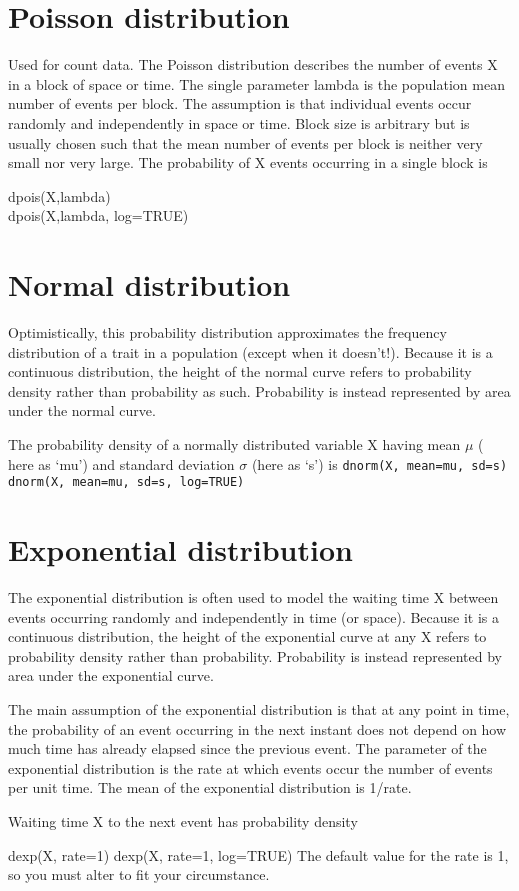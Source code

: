 \documentclass[12pt, a4paper]{article}
\theoremstyle{plain}
\theoremstyle{definition}
\theoremstyle{remark}
\begin{document}
\section{Poisson distribution}
Used for count data. The Poisson distribution describes the number of events X in a block of space or time. The single parameter lambda is the population mean number of events per block. The assumption is that individual events occur randomly and independently in space or time. Block size is arbitrary but is usually chosen such that the mean number of events per block is neither very small nor very large. The probability of X events occurring in a single block is

dpois(X,lambda)\\
dpois(X,lambda, log=TRUE)
\section{Normal distribution}
Optimistically, this probability distribution approximates the frequency distribution of a trait in a population (except when it doesn't!). Because it is a continuous distribution, the height of the normal curve refers to probability density rather than probability as such. Probability is instead represented by area under the normal curve.

The probability density of a normally distributed variable X having mean $\mu$ ( here as `mu') and standard deviation $\sigma$ (here as `s')  is
\texttt{dnorm(X, mean=mu, sd=s)}
\texttt{dnorm(X, mean=mu, sd=s, log=TRUE)}
\newpage
\section{Exponential distribution}
The exponential distribution is often used to model the waiting time X between events occurring randomly and independently in time (or space). Because it is a continuous distribution, the height of the exponential curve at any X refers to probability density rather than probability. Probability is instead represented by area under the exponential curve.

The main assumption of the exponential distribution is that at any point in time, the probability of an event occurring in the next instant does not depend on how much time has already elapsed since the previous event. The parameter of the exponential distribution is the rate at which events occur  the number of events per unit time. The mean of the exponential distribution is 1/rate.

Waiting time X to the next event has probability density

dexp(X, rate=1)
dexp(X, rate=1, log=TRUE)
The default value for the rate is 1, so you must alter to fit your circumstance.
\end{document}
